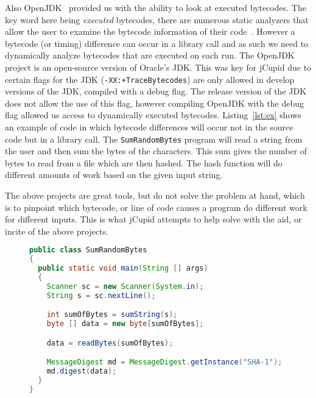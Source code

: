 \documentclass[letterpaper,twocolumn,10pt]{article}
\begin{document}
Also OpenJDK~\cite{OpenJDK} provided us with the ability to look at executed bytecodes. The key word here being \emph{executed} bytecodes, there are numerous static analyzers that allow the user to examine the bytecode information of their code~\cite{vallee1999soot}. However a bytecode (or timing) difference can occur in a library call and as such we need to dynamically analyze bytecodes that are executed on each run. The OpenJDK project is an open-source version of Oracle's JDK. This was key for jCupid due to certain flags for the JDK (\texttt{-XX:+TraceBytecodes}) are only allowed in develop versions of the JDK, compiled with a debug flag. The release version of the JDK does not allow the use of this flag, however compiling OpenJDK with the debug flag allowed us access to dynamically executed bytecodes. Listing~\ref{lst:ex} shows an example of code in which bytecode differences will occur not in the source code but in a library call. The \texttt{SumRandomBytes} program will read a string from the user and then sum the bytes of the characters. This sum gives the number of bytes to read from a file which are then hashed. The hash function will do different amounts of work based on the given input string.

The above projects are great tools, but do not solve the problem at hand, which is to pinpoint which bytecode, or line of code causes a program do different work for different inputs. This is what jCupid attempts to help solve with the aid, or incite of the above projects.

\begin{figure}[t]
  \begin{center}
    \begin{lstlisting}[caption={Example of code with bytecode difference in library call},label={lst:ex},language=Java]
public class SumRandomBytes
{
  public static void main(String [] args)
  {
    Scanner sc = new Scanner(System.in);
    String s = sc.nextLine();

    int sumOfBytes = sumString(s);
    byte [] data = new byte[sumOfBytes];

    data = readBytes(sumOfBytes);

    MessageDigest md = MessageDigest.getInstance("SHA-1");
    md.digest(data);
  }
}
    \end{lstlisting}
  \end{center}
\end{figure}
\end{document}
